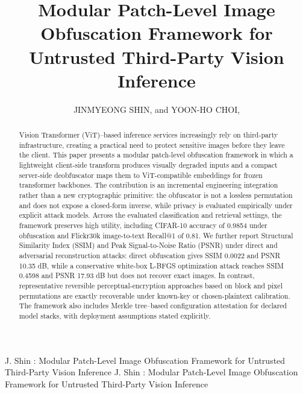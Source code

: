 \documentclass{ieeeaccess}
\newcommand{\rev}[1]{{\color{green}#1}}
\begin{document}

\title{Modular Patch-Level Image Obfuscation Framework for Untrusted Third-Party Vision Inference}
\author{\uppercase{Jinmyeong Shin}, and
\uppercase{Yoon-Ho Choi},}

\address[1]{Cloud Security Research Center, Pusan National University, Busan 46241, Republic of Korea}
\address[2]{School of Computer Science and Engineering, Pusan National University, Busan 46241, Republic of Korea}

\markboth
{J. Shin \headeretal: Modular Patch-Level Image Obfuscation Framework for Untrusted Third-Party Vision Inference}
{J. Shin \headeretal: Modular Patch-Level Image Obfuscation Framework for Untrusted Third-Party Vision Inference}



\begin{abstract}
\rev{Vision Transformer (ViT)--based inference services increasingly rely on third-party infrastructure, creating a practical need to protect sensitive images before they leave the client. This paper presents a modular patch-level obfuscation framework in which a lightweight client-side transform produces visually degraded inputs and a compact server-side deobfuscator maps them to ViT-compatible embeddings for frozen transformer backbones. The contribution is an incremental engineering integration rather than a new cryptographic primitive: the obfuscator is not a lossless permutation and does not expose a closed-form inverse, while privacy is evaluated empirically under explicit attack models. Across the evaluated classification and retrieval settings, the framework preserves high utility, including CIFAR-10 accuracy of 0.9854 under obfuscation and Flickr30k image-to-text Recall@1 of 0.81. We further report Structural Similarity Index (SSIM) and Peak Signal-to-Noise Ratio (PSNR) under direct and adversarial reconstruction attacks: direct obfuscation gives SSIM 0.0022 and PSNR 10.35 dB, while a conservative white-box L-BFGS optimization attack reaches SSIM 0.4598 and PSNR 17.93 dB but does not recover exact images. In contrast, representative reversible perceptual-encryption approaches based on block and pixel permutations are exactly recoverable under known-key or chosen-plaintext calibration. The framework also includes Merkle tree--based configuration attestation for declared model stacks, with deployment assumptions stated explicitly.}
\end{abstract}
\end{document}
